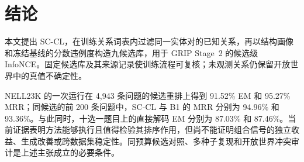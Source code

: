 \section{结论}

本文提出 SC-CL，在训练关系词表内过滤同一实体对的已知关系，再以结构画像和冻结基线的分数违例度构造九候选库，用于 GRIP Stage~2 的候选级 InfoNCE。固定候选库及其来源记录使训练流程可复核；未观测关系仍保留开放世界中的真值不确定性。

NELL23K 的一次运行在 4,943 条问题的候选重排上得到 91.52\% EM 和 95.27\% MRR；同候选的前 200 条问题中，SC-CL 与 B1 的 MRR 分别为 94.96\% 和 93.36\%。与此同时，十选一题目上的直接解码 EM 分别为 87.03\% 和 87.46\%。当前证据表明方法能够执行且值得检验其排序作用，但尚不能证明组合信号的独立收益、生成改善或跨数据集稳定性。同预算候选对照、多种子复现和开放世界冲突审计是上述主张成立的必要条件。
